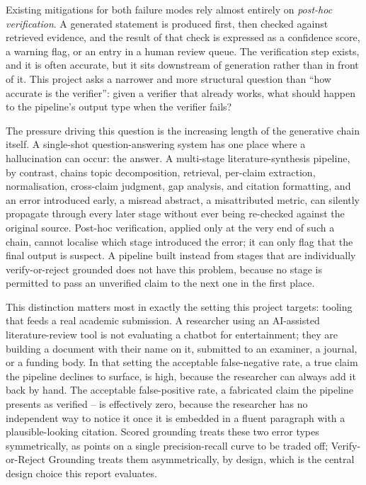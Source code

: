 \documentclass[12pt,a4paper]{report}
\begin{document}
Existing mitigations for both failure modes rely almost entirely on
\emph{post-hoc verification}. A generated statement is produced first, then
checked against retrieved evidence, and the result of that check is expressed as
a confidence score, a warning flag, or an entry in a human review queue. The
verification step exists, and it is often accurate, but it sits downstream of
generation rather than in front of it. This project asks a narrower and more
structural question than ``how accurate is the verifier'': given a verifier that
already works, what should happen to the pipeline's output type when the
verifier fails?

The pressure driving this question is the increasing length of the generative
chain itself. A single-shot question-answering system has one place where a
hallucination can occur: the answer. A multi-stage literature-synthesis
pipeline, by contrast, chains topic decomposition, retrieval, per-claim
extraction, normalisation, cross-claim judgment, gap analysis, and citation
formatting, and an error introduced early, a misread abstract, a
misattributed metric, can silently propagate through every later stage
without ever being re-checked against the original source. Post-hoc
verification, applied only at the very end of such a chain, cannot localise
which stage introduced the error; it can only flag that the final output is
suspect. A pipeline built instead from stages that are individually
verify-or-reject grounded does not have this problem, because no stage is
permitted to pass an unverified claim to the next one in the first place.

This distinction matters most in exactly the setting this project targets:
tooling that feeds a real academic submission. A researcher using an
AI-assisted literature-review tool is not evaluating a chatbot for
entertainment; they are building a document with their name on it, submitted
to an examiner, a journal, or a funding body. In that setting the acceptable
false-negative rate, a true claim the pipeline declines to surface, is
high, because the researcher can always add it back by hand. The acceptable
false-positive rate, a fabricated claim the pipeline presents as verified --
is effectively zero, because the researcher has no independent way to notice
it once it is embedded in a fluent paragraph with a plausible-looking
citation. Scored grounding treats these two error types symmetrically, as
points on a single precision-recall curve to be traded off; Verify-or-Reject
Grounding treats them asymmetrically, by design, which is the central design
choice this report evaluates.
\end{document}
